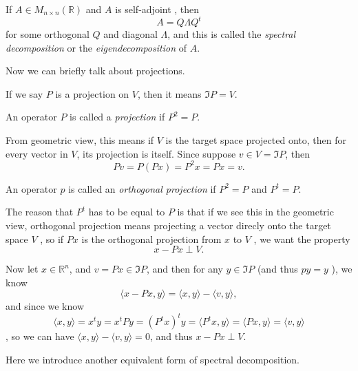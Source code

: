 \begin{theorem} \label{thm: spectral decomposition original}
  If \(A \in M_{n \times n}(\mathbb{R} )\) and \(A\) is self-adjoint , then
  \[
    A = Q \Lambda Q^t
  \] 
  for some orthogonal \(Q\) and diagonal \(\Lambda \), and this is called the \textit{spectral decomposition} or the \textit{eigendecomposition} of \(A\).  
\end{theorem}

Now we can briefly talk about projections. 

\begin{definition}
  If we say \(P\) is a projection on \(V\), then it means \(\Im P = V\).   
\end{definition}
\begin{definition}
  An operator \(P\) is called a \textit{projection} if \(P^2=P\).  
\end{definition}

From geometric view, this means if \(V\) is the target space projected onto, then for every vector in \(V\), its projection is itself. Since suppose \(v \in V = \Im P\), then 
\[
  Pv = P (Px) = P^2 x = Px = v.
\]   

\begin{definition}
  An operator \(p\) is called an \textit{orthogonal projection} if \(P^2=P\) and \(P^t = P\).  
\end{definition}

The reason that \(P^t\) has to be equal to \(P\) is that if we see this in the geometric view, orthogonal projection means projecting a vector direcly onto the target space \(V\) , so if \(Px\) is the orthogonal projection from \(x\) to \(V\) , we want the property 
\[
  x - Px \perp V.
\]   

Now let \(x \in \mathbb{R} ^n\), and \(v = Px \in \Im P\), and then for any \(y \in \Im P\) (and thus \(py = y\) ), we know 
\[
  \langle x - Px, y \rangle = \langle x, y \rangle - \langle v, y \rangle,  
\]   
and since we know 
\[
  \langle x, y \rangle = x^t y = x^t Py = \left( P^t x \right)^t y = \langle P^t x, y \rangle  = \langle Px, y \rangle  = \langle v, y \rangle 
\]
, so we can have \(\langle x, y \rangle - \langle v, y \rangle = 0  \), and thus \(x - Px \perp V\). 

Here we introduce another equivalent form of spectral decomposition.

